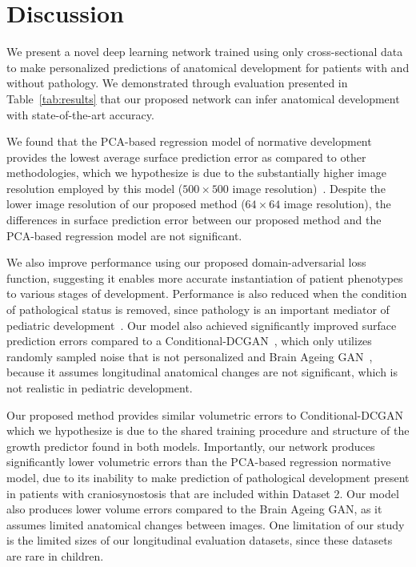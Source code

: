 \documentclass[conference]{IEEEtran}
\begin{document}
\section{Discussion}
We present a novel deep learning network trained using only cross-sectional data to make personalized predictions of anatomical development for patients with and without pathology. We demonstrated through evaluation presented in Table~\ref{tab:results} that our proposed network can infer anatomical development with state-of-the-art accuracy.

We found that the PCA-based regression model of normative development provides the lowest average surface prediction error as compared to other methodologies, which we hypothesize is due to the substantially higher image resolution employed by this model ($500\times500$ image resolution)~\cite{Liu2022Data-driven}. Despite the lower image resolution of our proposed method ($64\times64$ image resolution), the differences in surface prediction error between our proposed method and the PCA-based regression model are not significant.

We also improve performance using our proposed domain-adversarial loss function, suggesting it enables more accurate instantiation of patient phenotypes to various stages of development. Performance is also reduced when the condition of pathological status is removed, since pathology is an important mediator of pediatric development~\cite{Mathijssen2021Updated}. Our model also achieved significantly improved surface prediction errors compared to a Conditional-DCGAN~\cite{Radford2016Unsupervised}, which only utilizes randomly sampled noise that is not personalized and Brain Ageing GAN~\cite{Xia2021Learning}, because it assumes longitudinal anatomical changes are not significant, which is not realistic in pediatric development.

Our proposed method provides similar volumetric errors to Conditional-DCGAN which we hypothesize is due to the shared training procedure and structure of the growth predictor found in both models.
Importantly, our network produces significantly lower volumetric errors than the PCA-based regression normative model, due to its inability to make prediction of pathological development present in patients with craniosynostosis that are included within Dataset 2. Our model also produces lower volume errors compared to the Brain Ageing GAN, as it assumes limited anatomical changes between images. One limitation of our study is the limited sizes of our longitudinal evaluation datasets, since these datasets are rare in children.
\end{document}
